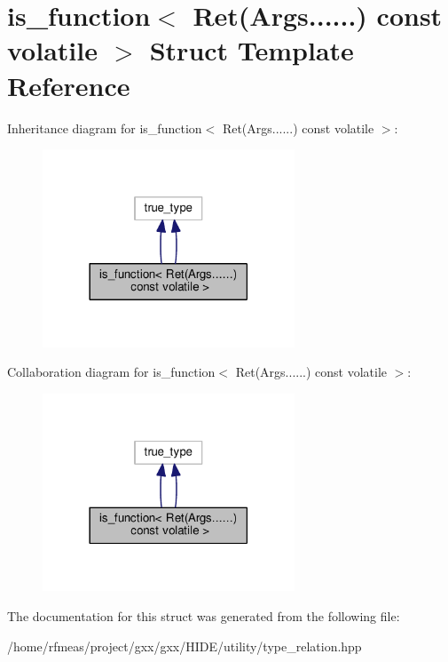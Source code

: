 \hypertarget{structis__function_3_01Ret_07Args_8_8_8_8_8_8_08_01const_01volatile_01_4}{}\section{is\+\_\+function$<$ Ret(Args......) const volatile $>$ Struct Template Reference}
\label{structis__function_3_01Ret_07Args_8_8_8_8_8_8_08_01const_01volatile_01_4}


Inheritance diagram for is\+\_\+function$<$ Ret(Args......) const volatile $>$\+:
\nopagebreak
\begin{figure}[H]
\begin{center}
\leavevmode
\includegraphics[width=213pt]{structis__function_3_01Ret_07Args_8_8_8_8_8_8_08_01const_01volatile_01_4__inherit__graph}
\end{center}
\end{figure}


Collaboration diagram for is\+\_\+function$<$ Ret(Args......) const volatile $>$\+:
\nopagebreak
\begin{figure}[H]
\begin{center}
\leavevmode
\includegraphics[width=213pt]{structis__function_3_01Ret_07Args_8_8_8_8_8_8_08_01const_01volatile_01_4__coll__graph}
\end{center}
\end{figure}


The documentation for this struct was generated from the following file\+:\begin{DoxyCompactItemize}
\item 
/home/rfmeas/project/gxx/gxx/\+H\+I\+D\+E/utility/type\+\_\+relation.\+hpp\end{DoxyCompactItemize}
